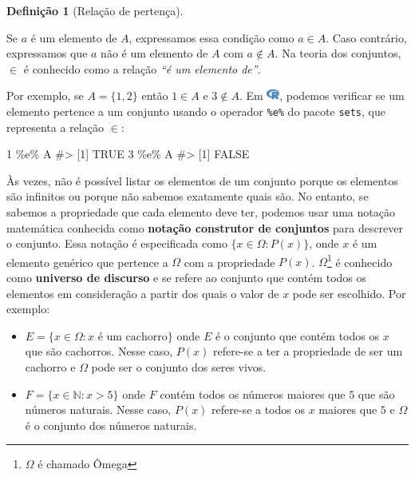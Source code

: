 \documentclass[
  letterpaper,
]{book}
\newenvironment{Shaded}{\begin{snugshade}}{\end{snugshade}}
\newcommand{\CommentTok}[1]{\textcolor[rgb]{0.37,0.37,0.37}{#1}}
\newcommand{\DecValTok}[1]{\textcolor[rgb]{0.68,0.00,0.00}{#1}}
\newcommand{\NormalTok}[1]{\textcolor[rgb]{0.00,0.23,0.31}{#1}}
\newcommand{\SpecialCharTok}[1]{\textcolor[rgb]{0.37,0.37,0.37}{#1}}
\providecommand{\tightlist}{%
  \setlength{\itemsep}{0pt}\setlength{\parskip}{0pt}}\usepackage{longtable,booktabs,array}
\theoremstyle{plain}
\theoremstyle{definition}
\newtheorem{definition}{Definição}[chapter]
\theoremstyle{remark}
\begin{document}
\begin{definition}[Relação de
pertença]\protect\hypertarget{def-membership-relation}{}\label{def-membership-relation}

Se \(a\) é um elemento de \(A\), expressamos essa condição como
\(a \in A\). Caso contrário, expressamos que \(a\) não é um elemento de
\(A\) com \(a \notin A\). Na teoria dos conjuntos, \(\in\) é conhecido
como a relação \emph{``é um elemento de''}.

\end{definition}

Por exemplo, se \(A = \{ 1 , 2 \}\) então \(1 \in A\) e \(3 \notin A\).
Em
\includegraphics[width=1.13em,height=1em]{naive_set_theory_files/figure-pdf/fa-icon-9b00320707d42527dde67262afb33ded.pdf},
podemos verificar se um elemento pertence a um conjunto usando o
operador \texttt{\%e\%} do pacote \texttt{sets}, que representa a
relação \(\in\):

\begin{Shaded}
\begin{Highlighting}[]
\DecValTok{1} \SpecialCharTok{\%e\%}\NormalTok{ A}
\CommentTok{\#\textgreater{} [1] TRUE}
\DecValTok{3} \SpecialCharTok{\%e\%}\NormalTok{ A}
\CommentTok{\#\textgreater{} [1] FALSE}
\end{Highlighting}
\end{Shaded}

Às vezes, não é possível listar os elementos de um conjunto porque os
elementos são infinitos ou porque não sabemos exatamente quais são. No
entanto, se sabemos a propriedade que cada elemento deve ter, podemos
usar uma notação matemática conhecida como \textbf{notação construtor de
conjuntos} para descrever o conjunto. Essa notação é especificada como
\(\{ x \in \Omega: P(x) \}\), onde \(x\) é um elemento genérico que
pertence a \(\Omega\) com a propriedade \(P(x)\). \(\Omega\)\footnote{\(\Omega\)
  é chamado Ômega} é conhecido como \textbf{universo de discurso} e se
refere ao conjunto que contém todos os elementos em consideração a
partir dos quais o valor de \(x\) pode ser escolhido. Por exemplo:

\begin{itemize}
\tightlist
\item
  \(E = \{ x \in \Omega: x \text{ é um cachorro} \}\) onde \(E\) é o
  conjunto que contém todos os \(x\) que são cachorros. Nesse caso,
  \(P(x)\) refere-se a ter a propriedade de ser um cachorro e \(\Omega\)
  pode ser o conjunto dos seres vivos.
\item
  \(F = \{ x \in \mathbb{N} : x > 5 \}\) onde \(F\) contém todos os
  números maiores que \(5\) que são números naturais. Nesse caso,
  \(P(x)\) refere-se a todos os \(x\) maiores que \(5\) e \(\Omega\) é o
  conjunto dos números naturais.
\end{itemize}
\end{document}

